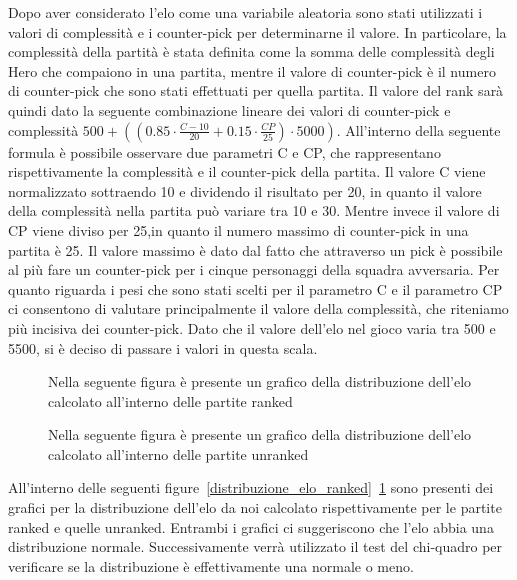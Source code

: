 Dopo aver considerato l'elo come una variabile aleatoria sono stati utilizzati i valori di complessità e i counter-pick per determinarne il valore. In particolare, la complessità della partità è stata definita come la somma delle complessità degli Hero che compaiono in una partita, mentre il valore di counter-pick è il numero di counter-pick che sono stati effettuati per quella partita. Il valore del rank sarà quindi dato la seguente combinazione lineare dei valori di counter-pick e complessità  \( 500 + \left( \left( 0.85 \cdot \frac{C - 10}{20} + 0.15 \cdot \frac{CP}{25} \right) \cdot 5000 \right) \). All'interno della seguente formula è possibile osservare due parametri C e CP, che rappresentano rispettivamente la complessità e il counter-pick della partita. Il valore C viene normalizzato sottraendo 10 e dividendo il risultato per 20, in quanto il valore della complessità nella partita può variare tra 10 e 30. Mentre invece il valore di CP viene diviso per 25,in quanto il numero massimo di counter-pick in una partita è 25. Il valore massimo è dato dal fatto che attraverso un pick è possibile al più fare un counter-pick per i cinque personaggi della squadra avversaria. Per quanto riguarda i pesi che sono stati scelti per il parametro C e il parametro CP ci consentono di valutare principalmente il valore della complessità, che riteniamo più incisiva dei counter-pick. Dato che il valore dell'elo nel gioco varia tra 500 e 5500, si è deciso di passare i valori in questa scala. \\
\begin{figure}[htbp]
\centering
\begin{multicols}{2}
\hspace*{-0.12\linewidth}

\caption{Nella seguente figura è presente un grafico della distribuzione dell'elo calcolato all'interno delle partite ranked}
\label{distribuzione_elo_ranked}
\hspace*{-0.1\linewidth}

\caption{Nella seguente figura è presente un grafico della distribuzione dell'elo calcolato all'interno delle partite unranked}
\label{distribuzione_elo_unranked}
\end{multicols}
\end{figure}
All'interno delle seguenti figure~\ref{distribuzione_elo_ranked}~\ref{distribuzione_elo_unranked} sono presenti dei grafici per la distribuzione dell'elo da noi calcolato rispettivamente per le partite ranked e quelle unranked. Entrambi i grafici ci suggeriscono che l'elo abbia una distribuzione normale. Successivamente verrà utilizzato il test del chi-quadro per verificare se la distribuzione è effettivamente una normale o meno.  \\

